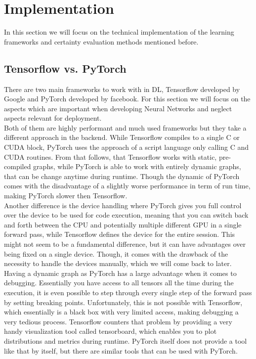 \documentclass[11pt,a4paper]{article}
\begin{document}
	\section{Implementation}\label{sec:implementation}
	In this section we will focus on the technical implementation of the learning frameworks and certainty evaluation methods mentioned before.

	\subsection{Tensorflow vs. PyTorch}\label{subsec:tensorflow-vs.-pytorch}
	There are two main frameworks to work with in DL, Tensorflow developed by Google and PyTorch developed by facebook.
	For this section we will focus on the aspects which are important when developing Neural Networks and neglect aspects relevant for deployment.\\

	Both of them are highly performant and much used frameworks but they take a different approach in the backend.
	While Tensorflow compiles to a single C or CUDA block, PyTorch uses the approach of a script language only calling C and CUDA routines.
	From that follows, that Tensorflow works with static, pre-compiled graphs, while PyTorch is able to work with entirely dynamic graphs, that can be change anytime during runtime.
	Though the dynamic of PyTorch comes with the disadvantage of a slightly worse performance in term of run time, making PyTorch slower then Tensorflow.\\

	Another difference is the device handling where PyTorch gives you full control over the device to be used for code execution, meaning that you can switch back and forth between the CPU and potentially multiple different GPU in a single forward pass, while Tensorflow defines the device for the entire session.
	This might not seem to be a fundamental difference, but it can have advantages over being fixed on a single device.
	Though, it comes with the drawback of the necessity to handle the devices manually, which we will come back to later.\\

	Having a dynamic graph as PyTorch has a large advantage when it comes to debugging.
	Essentially you have access to all tensors all the time during the execution, it is even possible to step through every single step of the forward pass by setting breaking points.
	Unfortunately, this is not possible with Tensorflow, which essentially is a black box with very limited access, making debugging a very tedious process.
	Tensorflow counters that problem by providing a very handy visualization tool called tensorboard, which enables you to plot distributions and metrics during runtime.
	PyTorch itself does not provide a tool like that by itself, but there are similar tools that can be used with PyTorch.\\
\end{document}
